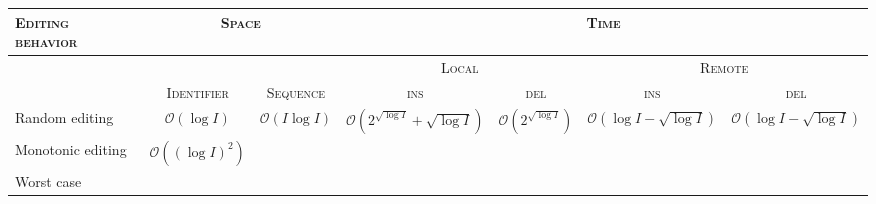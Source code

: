 
\begin{tabular}{@{}lcccccc@{}}
  \toprule
  \textsc{Editing behavior} & \multicolumn{2}{c}{\textsc{Space}} & \multicolumn{4}{c}{\textsc{Time}} \\ \midrule
  & & & \multicolumn{2}{c}{\textsc{Local}} & \multicolumn{2}{c}{\textsc{Remote}} \\ \midrule
  & \textsc{Identifier} & \textsc{Sequence} & \textsc{ins} & \textsc{del} & \textsc{ins} & \textsc{del}  \\ \midrule
  Random editing & $\mathcal{O}(\log I)$ & $\mathcal{O}(I\log I)$ & $\mathcal{O}(2^{\sqrt{\log I}}+\sqrt{\log I})$ & $\mathcal{O}(2^{\sqrt{\log I}})$ & $\mathcal{O}(\log I - \sqrt{\log I})$ & $\mathcal{O}(\log I - \sqrt{\log I})$ \\
  Monotonic editing & $\mathcal{O}((\log I)^2)$ & & & & & \\
  Worst case & & & & & & \\ \bottomrule
\end{tabular}



